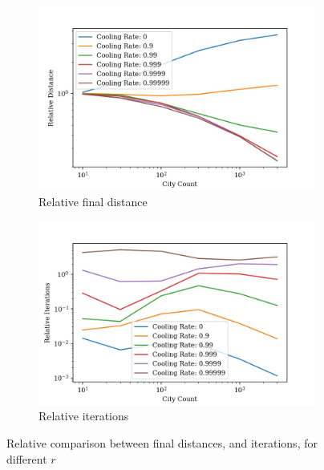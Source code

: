 \documentclass{article}
\begin{document}
\begin{figure}[H]
    \centering
    \begin{subfigure}{0.5\textwidth}
        \centering
        \includegraphics[width=1\linewidth]{images/rand_cooling_rate_city_count_distance_relative.jpg}
        \caption{Relative final distance}
        \label{fig:sub1}
    \end{subfigure}%
    \begin{subfigure}{0.5\textwidth}
        \centering
        \includegraphics[width=1\linewidth]{images/rand_cooling_rate_city_count_iterations_relative.jpg}
        \caption{Relative iterations}
        \label{fig:sub2}
    \end{subfigure}
    \captionsetup{justification=centering}
    \label{rand-cooling-rate}
    \caption{Relative comparison between final distances, and iterations, for different $r$}
\end{figure}
\end{document}
